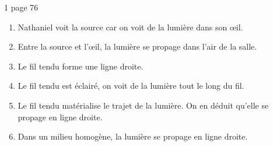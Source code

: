 \begin{myact}{1 page 76}
	\begin{enumerate}
		\item Nathaniel voit la source car on voit de la lumière dans son \oe il.\pause
		\item Entre la source et l'\oe il, la lumière se propage dans l'air de la salle.\pause
		\item Le fil tendu forme une ligne droite.\pause
		\item Le fil tendu est éclairé, on voit de la lumière tout le long du fil.\pause
		\item Le fil tendu matérialise le trajet de la lumière. On en déduit qu'elle se propage en ligne droite.\pause
		\item Dans un milieu homogène, la lumière se propage en ligne droite.
	\end{enumerate}
\end{myact}